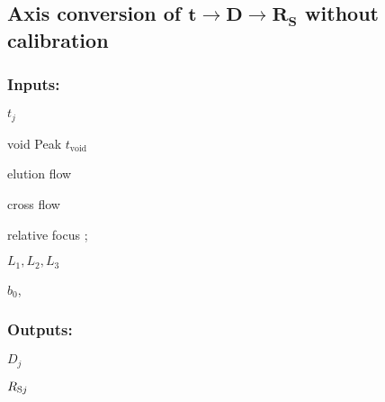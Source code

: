 \subsection*{Axis conversion of $\bm{t \longrightarrow D \longrightarrow R_S }$ without 
calibration}

\subsubsection*{Inputs:}
\begin{multicols}{3}
  \begin{packed_item}
    \item $t_j$
    \item void Peak $t_\mathrm{void}$
\item elution flow \Ve
\item cross flow \Vc
\item relative focus \zP;
\item $L_1, L_2, L_3$
\item $b_0$, \bL   
  \end{packed_item}
\end{multicols}

\subsubsection*{Outputs:}
\begin{multicols}{3}
  \begin{packed_item}
    \item  $D_{j}$
    \item $R_{\text{S}j}$
  \end{packed_item}
\end{multicols}

